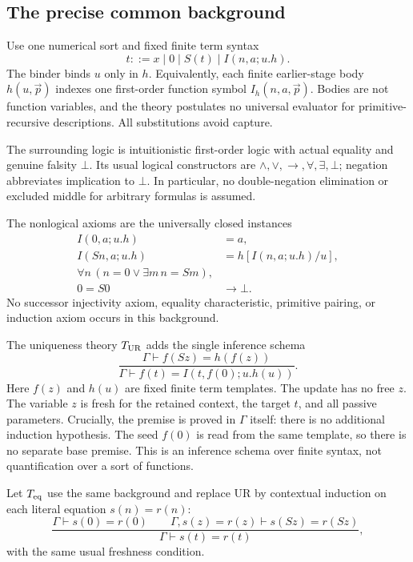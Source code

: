 \documentclass[11pt]{article}
\theoremstyle{definition}\newtheorem{definition}[theorem]{Definition}
\begin{document}
\subsection{The precise common background}
Use one numerical sort and fixed finite term syntax
\[
 t ::= x\mid0\mid S(t)\mid I(n,a;u.h).
\]
The binder binds $u$ only in $h$.  Equivalently, each finite earlier-stage
body $h(u,\vec p)$ indexes one first-order function symbol
$I_h(n,a,\vec p)$.  Bodies are not function variables, and the theory
postulates no universal evaluator for primitive-recursive descriptions.
All substitutions avoid capture.

The surrounding logic is intuitionistic first-order logic with actual
equality and genuine falsity $\bot$.  Its usual logical constructors are
$\land,\lor,\to,\forall,\exists,\bot$; negation abbreviates implication
to $\bot$.  In particular, no double-negation elimination or excluded
middle for arbitrary formulas is assumed.

The nonlogical axioms are the universally closed instances
\begin{align*}
 I(0,a;u.h)&=a,\\
 I(Sn,a;u.h)&=h[I(n,a;u.h)/u],\\
 \forall n\,(n=0\lor\exists m\,n=Sm),&\\
 0=S0&\longrightarrow\bot.
\end{align*}
No successor injectivity axiom, equality characteristic, primitive
pairing, or induction axiom occurs in this background.

The uniqueness theory $T_{\rm UR}$ adds the single inference schema
\[
 \boxed{\qquad
 \frac{\Gamma\vdash f(Sz)=h(f(z))}
      {\Gamma\vdash f(t)=I(t,f(0);u.h(u))}.
 \qquad}                                                \tag{UR}
\]
Here $f(z)$ and $h(u)$ are fixed finite term templates.  The update has
no free $z$.  The variable $z$ is fresh for the retained context,
the target $t$, and all passive parameters.  Crucially, the premise is
proved in $\Gamma$ itself: there is no additional induction hypothesis.
The seed $f(0)$ is read from the same template, so there is no separate
base premise.  This is an inference schema over finite syntax, not
quantification over a sort of functions.

Let $T_{\rm eq}$ use the same background and replace UR by contextual
induction on each literal equation $s(n)=r(n)$:
\[
 \frac{\Gamma\vdash s(0)=r(0)\qquad
       \Gamma,s(z)=r(z)\vdash s(Sz)=r(Sz)}
      {\Gamma\vdash s(t)=r(t)},                         \tag{EI}
\]
with the same usual freshness condition.
\end{document}
